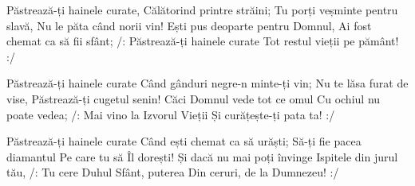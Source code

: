 \beginverse
Păstrează-ți hainele curate,
Călătorind printre străini;
Tu porți veșminte pentru slavă,
Nu le păta când norii vin!
Ești pus deoparte pentru Domnul,
Ai fost chemat ca să fii sfânt;
/: Păstrează-ți hainele curate
Tot restul vieții pe pământ! :/
\endverse

\beginverse
Păstrează-ți hainele curate
Când gânduri negre-n minte-ți vin;
Nu te lăsa furat de vise,
Păstrează-ți cugetul senin!
Căci Domnul vede tot ce omul
Cu ochiul nu poate vedea;
/: Mai vino la Izvorul Vieții
Și curățește-ți pata ta! :/
\endverse

\beginverse
Păstrează-ți hainele curate
Când ești chemat ca să urăști;
Să-ți fie pacea diamantul
Pe care tu să Îl dorești!
Și dacă nu mai poți învinge
Ispitele din jurul tău,
/: Tu cere Duhul Sfânt, puterea
Din ceruri, de la Dumnezeu! :/
\endverse
\endsong